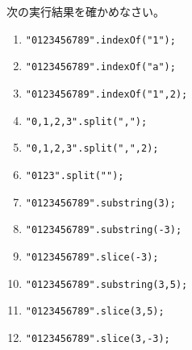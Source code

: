 \begin{Prob}\upshape
 次の実行結果を確かめなさい。
 \begin{enumerate}
	\item \texttt{"0123456789".indexOf("1");}
	\item \texttt{"0123456789".indexOf("a");}
	\item \texttt{"0123456789".indexOf("1",2);}
	\item \texttt{"0,1,2,3".split(",");}
	\item \texttt{"0,1,2,3".split(",",2);}
	\item \texttt{"0123".split("");}
	\item \texttt{"0123456789".substring(3);}
	\item \texttt{"0123456789".substring(-3);}
	\item \texttt{"0123456789".slice(-3);}
	\item \texttt{"0123456789".substring(3,5);}
	\item \texttt{"0123456789".slice(3,5);}
	\item \texttt{"0123456789".slice(3,-3);}
 \end{enumerate}
\end{Prob}
